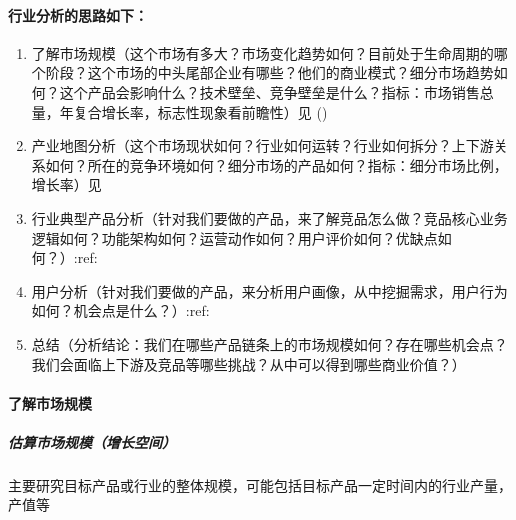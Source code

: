 \documentclass[letterpaper,10pt,english]{sphinxmanual}
\begin{document}
\paragraph{行业分析的思路如下：}
\label{\detokenize{chapter_knowledge/industry_analysis:id6}}\begin{enumerate}
%
\item {} 
了解市场规模（这个市场有多大？市场变化趋势如何？目前处于生命周期的哪个阶段？这个市场的中头尾部企业有哪些？他们的商业模式？细分市场趋势如何？这个产品会影响什么？技术壁垒、竞争壁垒是什么？指标：市场销售总量，年复合增长率，标志性现象看前瞻性）见
{\hyperref[\detokenize{chapter_knowledge/industry_analysis:market-size}]{}} ()

\item {} 
产业地图分析（这个市场现状如何？行业如何运转？行业如何拆分？上下游关系如何？所在的竞争环境如何？细分市场的产品如何？指标：细分市场比例，增长率）见

\item {} 
行业典型产品分析（针对我们要做的产品，来了解竞品怎么做？竞品核心业务逻辑如何？功能架构如何？运营动作如何？用户评价如何？优缺点如何？）:ref:

\item {} 
用户分析（针对我们要做的产品，来分析用户画像，从中挖掘需求，用户行为如何？机会点是什么？）:ref:

\item {} 
总结（分析结论：我们在哪些产品链条上的市场规模如何？存在哪些机会点？我们会面临上下游及竞品等哪些挑战？从中可以得到哪些商业价值？）

\end{enumerate}


\paragraph{了解市场规模}
\label{\detokenize{chapter_knowledge/industry_analysis:market-size}}\label{\detokenize{chapter_knowledge/industry_analysis:id7}}

\subparagraph{估算市场规模（增长空间）}
\label{\detokenize{chapter_knowledge/industry_analysis:id8}}
主要研究目标产品或行业的整体规模，可能包括目标产品一定时间内的行业产量，产值等
%
\begin{footnote}[502]\sphinxAtStartFootnote
{}
%
\end{footnote}
\end{document}
